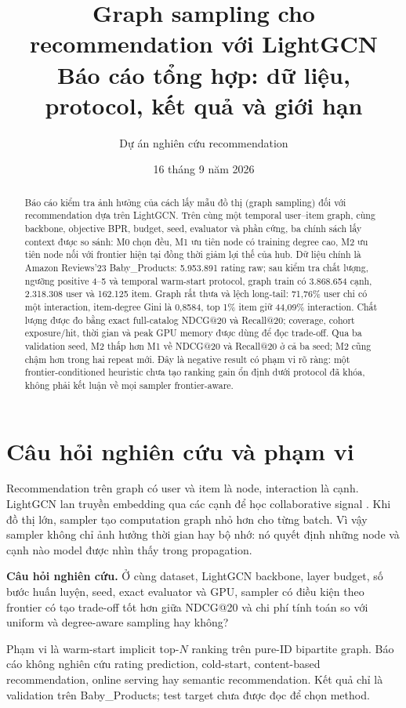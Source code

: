 \documentclass[12pt,a4paper]{article}
\title{\textbf{Graph sampling cho recommendation với LightGCN}\\\large Báo cáo tổng hợp: dữ liệu, protocol, kết quả và giới hạn}
\author{Dự án nghiên cứu recommendation}
\date{16 tháng 9 năm 2026}
\begin{document}
\maketitle

\begin{abstract}
Báo cáo kiểm tra ảnh hưởng của cách lấy mẫu đồ thị (graph sampling) đối với recommendation dựa trên LightGCN. Trên cùng một temporal user--item graph, cùng backbone, objective BPR, budget, seed, evaluator và phần cứng, ba chính sách lấy context được so sánh: M0 chọn đều, M1 ưu tiên node có training degree cao, M2 ưu tiên node nối với frontier hiện tại đồng thời giảm lợi thế của hub. Dữ liệu chính là Amazon Reviews'23 Baby\_Products: 5.953.891 rating raw; sau kiểm tra chất lượng, ngưỡng positive 4--5 và temporal warm-start protocol, graph train có 3.868.654 cạnh, 2.318.308 user và 162.125 item. Graph rất thưa và lệch long-tail: 71,76\% user chỉ có một interaction, item-degree Gini là 0,8584, top 1\% item giữ 44,09\% interaction. Chất lượng được đo bằng exact full-catalog NDCG@20 và Recall@20; coverage, cohort exposure/hit, thời gian và peak GPU memory được dùng để đọc trade-off. Qua ba validation seed, M2 thấp hơn M1 về NDCG@20 và Recall@20 ở cả ba seed; M2 cũng chậm hơn trong hai repeat mới. Đây là negative result có phạm vi rõ ràng: một frontier-conditioned heuristic chưa tạo ranking gain ổn định dưới protocol đã khóa, không phải kết luận về mọi sampler frontier-aware.
\end{abstract}

\section{Câu hỏi nghiên cứu và phạm vi}
Recommendation trên graph có user và item là node, interaction là cạnh. LightGCN lan truyền embedding qua các cạnh để học collaborative signal \cite{lightgcn}. Khi đồ thị lớn, sampler tạo computation graph nhỏ hơn cho từng batch. Vì vậy sampler không chỉ ảnh hưởng thời gian hay bộ nhớ: nó quyết định những node và cạnh nào model được nhìn thấy trong propagation.

\textbf{Câu hỏi nghiên cứu.} Ở cùng dataset, LightGCN backbone, layer budget, số bước huấn luyện, seed, exact evaluator và GPU, sampler có điều kiện theo frontier có tạo trade-off tốt hơn giữa NDCG@20 và chi phí tính toán so với uniform và degree-aware sampling hay không?

Phạm vi là warm-start implicit top-$N$ ranking trên pure-ID bipartite graph. Báo cáo không nghiên cứu rating prediction, cold-start, content-based recommendation, online serving hay semantic recommendation. Kết quả chỉ là validation trên Baby\_Products; test target chưa được đọc để chọn method.
\end{document}

